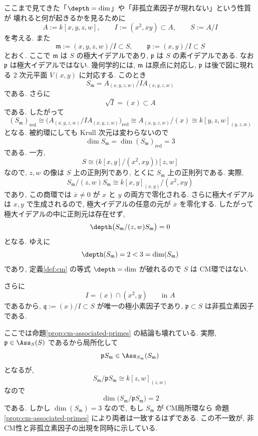 \documentclass[article,paper=b5paper]{jlreq}
\begin{document}
\begin{rem}[非CMの場合との対比]
    ここまで見てきた「$\depth=\dim$」や「非孤立素因子が現れない」という性質が
    壊れると何が起きるかを見るために
    \[
        A:=k[x,y,z,w],\qquad I:=(x^2,xy)\subset A,\qquad S:=A/I
    \]
    を考える. また
    \[
        \mathfrak{m}:=(x,y,z,w)/I \subset S,\qquad \mathfrak{p}:=(x,y)/I \subset S
    \]
    とおく. ここで $\mathfrak m$ は $S$ の極大イデアルであり,
    $\mathfrak p$ は $S$ の素イデアルである.
    なお $\mathfrak p$ は極大イデアルではない. 幾何学的には, $\mathfrak m$ は原点に対応し,
    $\mathfrak p$ は後で図に現れる 2 次元平面 $V(x,y)$ に対応する.
    このとき
    \[
        S_{\mathfrak{m}} = A_{(x,y,z,w)}/IA_{(x,y,z,w)}
    \]
    である. さらに
    \[
        \sqrt{I}=(x)\subset A
    \]
    である. したがって
    \[
        (S_{\mathfrak{m}})_{\mathrm{red}}
        \cong \bigl(A_{(x,y,z,w)}/IA_{(x,y,z,w)}\bigr)_{\mathrm{red}}
        \cong A_{(x,y,z,w)}/(x)
        \cong k[y,z,w]_{(y,z,w)}
    \]
    となる. 被約環にしても Krull 次元は変わらないので
    \[
        \dim S_{\mathfrak{m}}=\dim (S_{\mathfrak{m}})_{\mathrm{red}}=3
    \]
    である. 一方,
    \[
        S \cong \bigl(k[x,y]/(x^2,xy)\bigr)[z,w]
    \]
    なので, $z,w$ の像は $S$ 上の正則列であり, とくに $S_{\mathfrak{m}}$ 上の正則列である. 実際,
    \[
        S_{\mathfrak{m}}/(z,w)S_{\mathfrak{m}}
        \cong k[x,y]_{(x,y)}/(x^2,xy)
    \]
    であり, この商環では $\overline{x}\neq 0$ が $x$ と $y$ の両方で零化される.
    さらに極大イデアルは $x,y$ で生成されるので, 極大イデアルの任意の元が
    $\overline{x}$ を零化する. したがって極大イデアルの中に正則元は存在せず,
    \[
        \depth\bigl(S_{\mathfrak{m}}/(z,w)S_{\mathfrak{m}}\bigr)=0
    \]
    となる. ゆえに
    \[
        \depth(S_{\mathfrak{m}})=2<3=\dim(S_{\mathfrak{m}})
    \]
    であり, 定義\ref{def:cm} の等式 $\depth=\dim$ が破れるので $S$ は CM環ではない.

    さらに
    \[
        I=(x)\cap(x^2,y)\qquad \text{in } A
    \]
    であるから, $\mathfrak{q}:=(x)/I \subset S$ が唯一の極小素因子であり,
    $\mathfrak{p}\subset S$ は非孤立素因子である.

    ここでは命題\ref{prop:cm-associated-primes} の結論も壊れている.
    実際, $\mathfrak{p}\in \Ass_S(S)$ であるから局所化して
    \[
        \mathfrak{p}S_{\mathfrak{m}} \in \Ass_{S_{\mathfrak{m}}}(S_{\mathfrak{m}})
    \]
    となるが,
    \[
        S_{\mathfrak{m}}/\mathfrak{p}S_{\mathfrak{m}}
        \cong k[z,w]_{(z,w)}
    \]
    なので
    \[
        \dim\bigl(S_{\mathfrak{m}}/\mathfrak{p}S_{\mathfrak{m}}\bigr)=2
    \]
    である. しかし $\dim(S_{\mathfrak{m}})=3$ なので, もし $S_{\mathfrak{m}}$ が CM局所環なら
    命題\ref{prop:cm-associated-primes} により両者は一致するはずである. この不一致が,
    非CM性と非孤立素因子の出現を同時に示している.


\end{rem}
\end{document}
